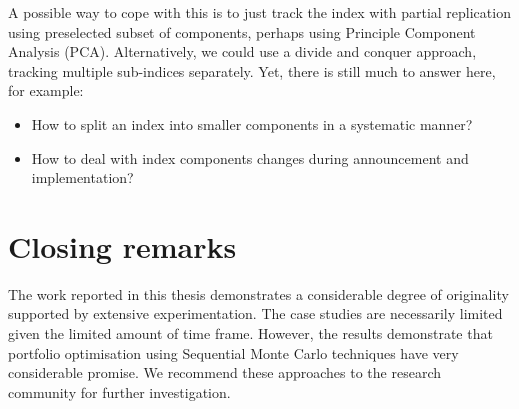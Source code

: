 A possible way to cope with this is to just track the index with partial replication using preselected subset of components, perhaps using Principle Component Analysis (PCA). Alternatively, we could use a divide and conquer approach, tracking multiple sub-indices separately. Yet, there is still much to answer here, for example:
\begin{itemize}
\item How to split an index into smaller components in a systematic manner?
\item How to deal with index components changes during announcement and implementation?
\end{itemize}

\section{Closing remarks}
\label{ClosingRemark}
The work reported in this thesis demonstrates a considerable degree of
originality supported by extensive experimentation. The case studies
are necessarily limited given the limited amount of time frame.  However, the results
 demonstrate that portfolio optimisation using Sequential Monte Carlo techniques have very considerable promise. We recommend these approaches to
the research community for further investigation.





